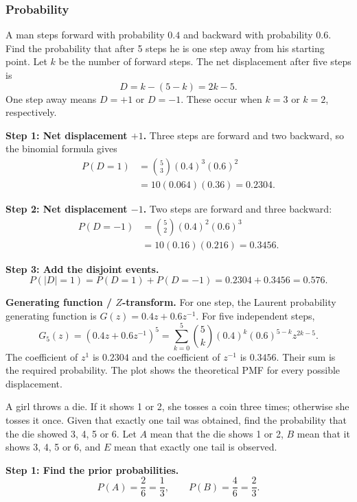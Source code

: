 \subsubsection{Probability}
\begin{enumerate}[label={},leftmargin=0pt,itemsep=9pt]
 A man steps forward with probability $0.4$ and backward with probability $0.6$. Find the probability that after 5 steps he is one step away from his starting point.
\solution Let $k$ be the number of forward steps. The net displacement after five steps is
\[
D=k-(5-k)=2k-5.
\]
One step away means $D=+1$ or $D=-1$. These occur when $k=3$ or $k=2$, respectively.

\textbf{Step 1: Net displacement $+1$.} Three steps are forward and two backward, so the binomial formula gives
\begin{align*}
P(D=1)&=\binom53(0.4)^3(0.6)^2\\
&=10(0.064)(0.36)=0.2304.
\end{align*}

\textbf{Step 2: Net displacement $-1$.} Two steps are forward and three backward:
\begin{align*}
P(D=-1)&=\binom52(0.4)^2(0.6)^3\\
&=10(0.16)(0.216)=0.3456.
\end{align*}

\textbf{Step 3: Add the disjoint events.}
\[
P(|D|=1)=P(D=1)+P(D=-1)=0.2304+0.3456=\boxed{0.576}.
\]

\textbf{Generating function / $Z$-transform.} For one step, the Laurent probability generating function is $G(z)=0.4z+0.6z^{-1}$. For five independent steps,
\[
G_5(z)=(0.4z+0.6z^{-1})^5
=\sum_{k=0}^5\binom5k(0.4)^k(0.6)^{5-k}z^{2k-5}.
\]
The coefficient of $z^1$ is $0.2304$ and the coefficient of $z^{-1}$ is $0.3456$. Their sum is the required probability. The plot shows the theoretical PMF for every possible displacement.

 A girl throws a die. If it shows 1 or 2, she tosses a coin three times; otherwise she tosses it once. Given that exactly one tail was obtained, find the probability that the die showed 3, 4, 5 or 6.
\solution Let $A$ mean that the die shows 1 or 2, $B$ mean that it shows 3, 4, 5 or 6, and $E$ mean that exactly one tail is observed.

\textbf{Step 1: Find the prior probabilities.}
\[
P(A)=\frac26=\frac13,\qquad P(B)=\frac46=\frac23.
\]


\end{enumerate}
